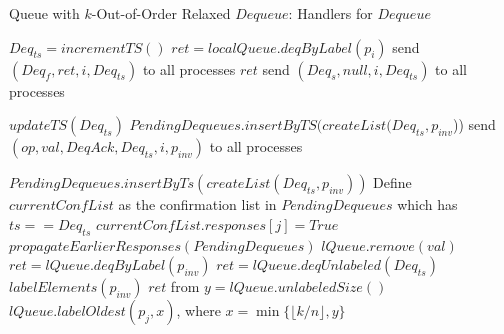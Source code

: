 \documentclass[a4paper,anonymous,USenglish]{lipics-v2021} %
\theoremstyle{definition}
\begin{document}
\begin{algorithm}
  \caption{Queue with $k$-Out-of-Order Relaxed $Dequeue$: Handlers for $Dequeue$}\label{alg:relaxed}
  \begin{algorithmic}[1]
      \State $Deq_{ts} = incrementTS()$
      \label{oooline:checkFast}
        \State $ret = localQueue.deqByLabel(p_i)$ \label{oooline:fastDeq}
        \State send $(Deq_f, ret, i, Deq_{ts})$ to all processes
        \State \Return $ret$ \label{oooline:fastDeqResponse}
      \Else
        \State send $(Deq_s, null, i, Deq_{ts})$ to all processes
      \EndIf
    \EndFunction

      \State $updateTS(Deq_{ts})$
        \State $PendingDequeues.insertByTS(createList(Deq_{ts}, p_{inv}$))
      \EndIf
      \State send $(op, val, DeqAck, Deq_{ts}, i, p_{inv})$ to all processes
    \EndFunction

        \State $PendingDequeues.insertByTs(createList(Deq_{ts}, p_{inv}))$
      \EndIf
      \State Define $currentConfList$ as the confirmation list in $PendingDequeues$ which has $ts == Deq_{ts}$
      \State $currentConfList.responses[j] = True$
      \State $propagateEarlierResponses(PendingDequeues)$ 
        \label{oooline:localExec}
             $lQueue.remove(val)$\EndIf
          \Else    
              \State $ret = lQueue.deqByLabel(p_{inv})$ \label{oooline:sDeqChooseLabeled}
            \Else
              \State $ret = lQueue.deqUnlabeled(Deq_{ts})$ \label{oooline:sDeqChooseUnlabeled}
            \EndIf
            \State $labelElements(p_{inv})$\label{oooline:label}
              \State \Return $ret$
            \EndIf
          \EndIf 
        \EndIf 
      \EndFor
      \EndFunction
%
       from \cite{TalmageWelch14}
      \State $y = lQueue.unlabeledSize()$
      \State $lQueue.labelOldest(p_j,x)$, where $x = \min\{\lfloor k/n\rfloor, y\}$\label{oooline:labelOldest}
      \EndFunction
  \end{algorithmic}
\end{algorithm}
\end{document}
